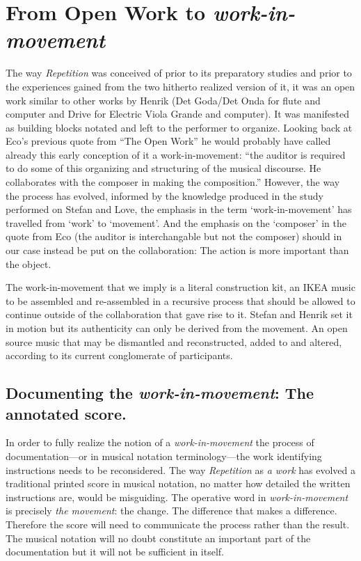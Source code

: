 \section{From Open Work to \textit{work-in-movement}}
\label{sec:from-open-work}

The way \emph{Repetition} was conceived of prior to its preparatory
studies and prior to the experiences gained from the two hitherto
realized version of it, it was an open work similar to other works by
Henrik (Det Goda/Det Onda for flute and computer and Drive for
Electric Viola Grande and computer). It was manifested as building
blocks notated and left to the performer to organize. Looking back at
Eco's previous quote from ``The Open Work'' he would probably have
called already this early conception of it a work-in-movement: ``the
auditor is required to do some of this organizing and structuring of
the musical discourse. He collaborates with the composer in making the
composition.'' However, the way the process has evolved, informed by
the knowledge produced in the study performed on Stefan and Love, the
emphasis in the term `work-in-movement' has travelled from `work' to
`movement'. And the emphasis on the `composer' in the quote from Eco
(the auditor is interchangable but not the composer) should in our
case instead be put on the collaboration: The action is more important
than the object.

The work-in-movement that we imply is a literal construction kit, an
IKEA music to be assembled and re-assembled in a recursive process
that should be allowed to continue outside of the collaboration that
gave rise to it. Stefan and Henrik set it in motion but its
authenticity can only be derived from the movement. An open source
music that may be dismantled and reconstructed, added to and altered,
according to its current conglomerate of participants.

\subsection{Documenting the \textit{work-in-movement}: The annotated score.}
\label{sec:docum-work-movem}

In order to fully realize the notion of a \emph{work-in-movement} the
process of documentation---or in musical notation terminology---the
work identifying instructions needs to be reconsidered. The way
\emph{Repetition} as \emph{a work} has evolved a traditional printed
score in musical notation, no matter how detailed the written
instructions are, would be misguiding. The operative word in
\emph{work-in-movement} is precisely \emph{the movement}: the
change. The difference that makes a difference. Therefore the score
will need to communicate the process rather than the result. The
musical notation will no doubt constitute an important part of the
documentation but it will not be sufficient in itself. 

